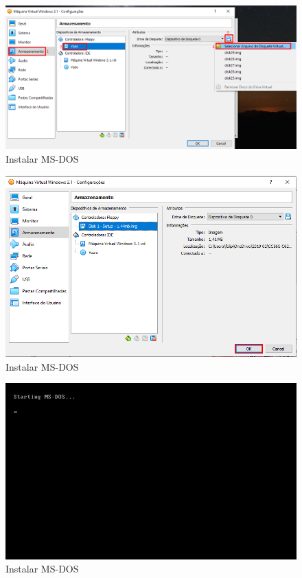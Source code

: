 \documentclass{report}
\begin{document}
\begin{figure}
\centering
\includegraphics[width=\textwidth]{Screenshot_10.png}
\caption{Instalar MS-DOS}
\label{fig:10}
\end{figure}

\begin{figure}
\centering
\includegraphics[width=\textwidth]{Screenshot_11.png}
\caption{Instalar MS-DOS}
\label{fig:11}
\end{figure}

\begin{figure}
\centering
\includegraphics[width=\textwidth]{Screenshot_12.png}
\caption{Instalar MS-DOS}
\label{fig:12}
\end{figure}
\end{document}
